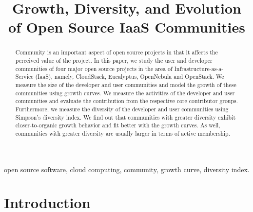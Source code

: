 \documentclass[conference]{IEEEtran}
\begin{document}
\title{Growth, Diversity, and Evolution of Open Source IaaS Communities}

\author{
}

\maketitle


\begin{abstract}
Community is an important aspect of open source projects in that it affects the perceived value of the project. In this paper, we study the user and developer communities of four major open source projects in the area of Infrastructure-as-a-Service (IaaS), namely, CloudStack, Eucalyptus, OpenNebula and OpenStack. We measure the size of the developer and user communities and model the growth of these communities using growth curves. We measure the activities of the developer and user communities and evaluate the contribution from the respective core contributor groups. Furthermore, we measure the diversity of the developer and user communities using Simpson's diversity index. We find out that communities with greater diversity exhibit closer-to-organic growth behavior and fit better with the growth curves. As well, communities with greater diversity are usually larger in terms of active membership.
\end{abstract}

\begin{IEEEkeywords}
open source software, cloud computing, community, growth curve, diversity index.
\end{IEEEkeywords}

\section{Introduction}
\label{sec:intro}
\end{document}
